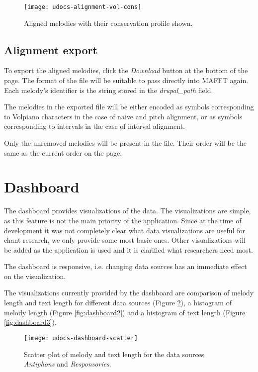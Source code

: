 \begin{figure}[!h]
\centering
\texttt{[image: udocs-alignment-vol-cons]}
\caption{Aligned melodies with their conservation profile shown.}
\label{fig:align-cons}
\end{figure}

\subsection{Alignment export}

To export the aligned melodies, click the \emph{Download} button at the bottom of the page. The format of the file will be suitable to pass directly into MAFFT again. Each melody's
identifier is the string stored in the \emph{drupal\_path} field.

The melodies in the exported file will be either encoded as symbols corresponding to Volpiano characters in the case of naive and pitch alignment, or as symbols corresponding to intervals
in the case of interval alignment.

Only the unremoved melodies will be present in the file. Their order will be the same as the current order on the page.

\section{Dashboard}

The dashboard provides visualizations of the data. The visualizations are simple, as this feature is not the main priority of the application. Since at the time of development
it was not completely clear what data visualizations are useful for chant research, we only provide some most basic ones. Other visualizations will be added
as the application is used and it is clarified what researchers need most.

The dashboard is responsive, i.e. changing data sources has an immediate effect on the visualization.

The visualizations currently provided by the dashboard are comparison of melody length and text length for different data sources (Figure \ref{fig:dashboard1}),
a histogram of melody length (Figure \ref{fig:dashboard2}) and a histogram of text length (Figure \ref{fig:dashboard3}).

\begin{figure}[!h]
\centering
\texttt{[image: udocs-dashboard-scatter]}
\caption{Scatter plot of melody and text length for the data sources \emph{Antiphons} and \emph{Responsories}.}
\label{fig:dashboard1}
\end{figure}

